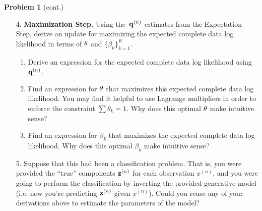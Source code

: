\documentclass[submit]{../harvardml}
\begin{document}
\begin{framed}
  \noindent\textbf{Problem 1} (cont.)\\
  \begin{enumerate}
    \item[4.] \textbf{Maximization Step.}
    Using the~$\mathbf{q}^{(n)}$ estimates from the Expectation Step, derive an update for maximizing the expected complete data log likelihood in terms of $\mathbf{\theta}$ and $\{ \beta_k \}^K_{k=1}$.

    \begin{enumerate}
      \item Derive an expression for the expected complete data log likelihood using $\mathbf{q}^{(n)}$.
      \item Find an expression for $\mathbf{\theta}$ that maximizes this expected complete data log likelihood. You may find it helpful to use Lagrange multipliers in order to enforce the constraint $\sum \theta_k = 1$. Why does this optimal $\mathbf{\theta}$ make intuitive sense?
      \item Find an expression for $\beta_k$ that maximizes the expected complete data log likelihood.  Why does this optimal $\beta_k$  make intuitive sense?
    \end{enumerate}
      
    \item[5.] Suppose that this had been a classification problem. That is,
    you were provided the ``true'' components $\mathbf{z}^{(n)}$ for each
    observation $x^{(n)}$,
    and you were going to perform the classification by
    inverting the provided generative model (i.e. now you're predicting $\mathbf{z}^{(n)}$ given $x^{(n)}$). Could you reuse any of
    your derivations above to estimate the parameters of the model?
  \end{enumerate}
\end{framed}
\end{document}
